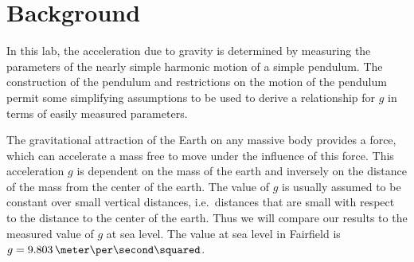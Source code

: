 
\iffalse
\labChapter{M}{The Measurement of $g$ with a Simple Pendulum}
\else
\fi
\label{lab:M10}












\section{Background}

In this lab, the acceleration due to gravity is determined by measuring the parameters of the nearly simple harmonic motion of a simple pendulum.  The construction of the pendulum and restrictions on the motion of the pendulum permit some simplifying assumptions to be used to derive a relationship for $g$ in terms of easily measured parameters.

The gravitational attraction of the Earth on any massive body provides a force, which can accelerate a mass free to move under the influence of this force.  This acceleration $g$ is dependent on the mass of the earth and inversely on the distance of the mass from the center of the earth.  The value of $g$ is usually assumed to be constant over small vertical distances, i.e.\ distances that are small with respect to the distance to the center of the earth.  Thus we will compare our results to the measured value of $g$ at sea level.  The value at sea level in Fairfield is $g = 9.803\,\meter\per\second\squared$.


